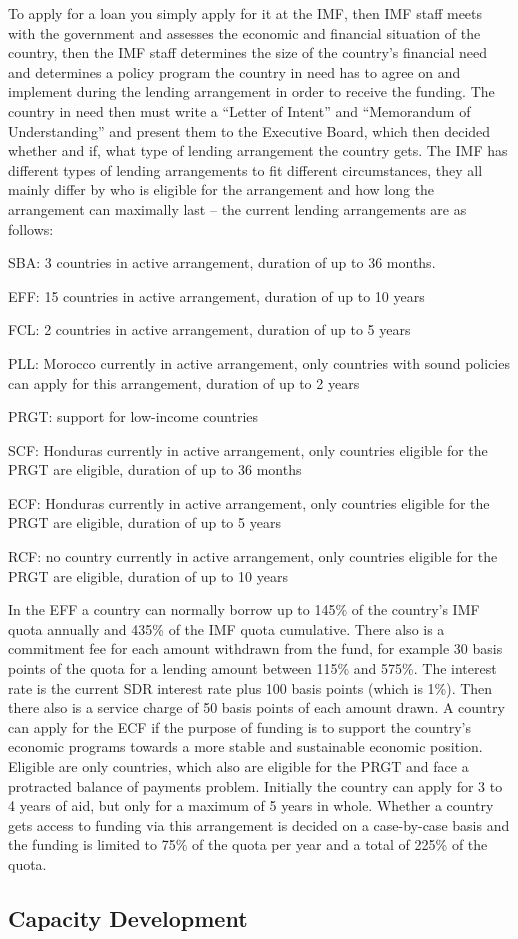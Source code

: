 To apply for a loan you simply apply for it at the \gls{IMF}, then \gls{IMF} staff meets with the government and assesses the economic and financial situation of the country, then the \gls{IMF} staff determines the size of the country’s financial need and determines a policy program the country in need has to agree on and implement during the lending arrangement in order to receive the funding. The country in need then must write a “Letter of Intent” and “Memorandum of Understanding” and present them to the Executive Board, which then decided whether and if, what type of lending arrangement the country gets.\cite{InternationalMonetaryFundIMFLending2020}
The \gls{IMF} has different types of lending arrangements to fit different circumstances, they all mainly differ by who is eligible for the arrangement and how long the arrangement can maximally last – the current lending arrangements are as follows:
\begin{compactitem}
	\item \gls{SBA}: 3 countries in active arrangement, duration of up to 36 months.
	\item \gls{EFF}: 15 countries in active arrangement, duration of up to 10 years
	\item \gls{FCL}: 2 countries in active arrangement, duration of up to 5 years
	\item \gls{PLL}: Morocco currently in active arrangement, only countries with sound policies can apply for this arrangement, duration of up to 2 years
	\item \gls{PRGT}: support for low-income countries
	\item \gls{SCF}: Honduras currently in active arrangement, only countries eligible for the \gls{PRGT} are eligible, duration of up to 36 months
	\item \gls{ECF}: Honduras currently in active arrangement, only countries eligible for the \gls{PRGT} are eligible, duration of up to 5 years
	\item \gls{RCF}: no country currently in active arrangement, only countries eligible for the \gls{PRGT} are eligible, duration of up to 10 years
\end{compactitem}
In the EFF a country can normally borrow up to 145\% of the country’s \gls{IMF} quota annually and 435\% of the \gls{IMF} quota cumulative. There also is a commitment fee for each amount withdrawn from the fund, for example 30 basis points of the quota for a lending amount between 115\% and 575\%. The interest rate is the current \gls{SDR} interest rate plus 100 basis points (which is 1\%). Then there also is a service charge of 50 basis points of each amount drawn.
A country can apply for the \gls{ECF} if the purpose of funding is to support the country’s economic programs towards a more stable and sustainable economic position. Eligible are only countries, which also are eligible for the \gls{PRGT} and face a protracted balance of payments problem. Initially the country can apply for 3 to 4 years of aid, but only for a maximum of 5 years in whole. Whether a country gets access to funding via this arrangement is decided on a case-by-case basis and the funding is limited to 75\% of the quota per year and a total of 225\% of the quota.


\subsection{Capacity Development}